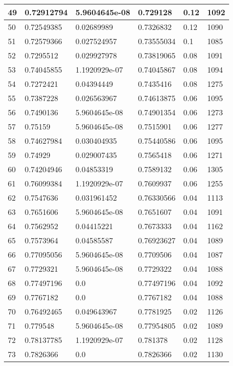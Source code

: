 \begin{longtable}{|l|l|l|l|l|l|}
49 & 0.72912794 & 5.9604645e-08 & 0.729128 & 0.12 & 1092 \\ \hline 
50 & 0.72549385 & 0.02689989 & 0.7326832 & 0.12 & 1090 \\ \hline 
51 & 0.72579366 & 0.027524957 & 0.73555034 & 0.1 & 1085 \\ \hline 
52 & 0.7295512 & 0.029927978 & 0.73819065 & 0.08 & 1091 \\ \hline 
53 & 0.74045855 & 1.1920929e-07 & 0.74045867 & 0.08 & 1094 \\ \hline 
54 & 0.7272421 & 0.04394449 & 0.7435416 & 0.08 & 1275 \\ \hline 
55 & 0.7387228 & 0.026563967 & 0.74613875 & 0.06 & 1095 \\ \hline 
56 & 0.7490136 & 5.9604645e-08 & 0.74901354 & 0.06 & 1273 \\ \hline 
57 & 0.75159 & 5.9604645e-08 & 0.7515901 & 0.06 & 1277 \\ \hline 
58 & 0.74627984 & 0.030404935 & 0.75440586 & 0.06 & 1095 \\ \hline 
59 & 0.74929 & 0.029007435 & 0.7565418 & 0.06 & 1271 \\ \hline 
60 & 0.74204946 & 0.04853319 & 0.7589132 & 0.06 & 1305 \\ \hline 
61 & 0.76099384 & 1.1920929e-07 & 0.7609937 & 0.06 & 1255 \\ \hline 
62 & 0.7547636 & 0.031961452 & 0.76330566 & 0.04 & 1113 \\ \hline 
63 & 0.7651606 & 5.9604645e-08 & 0.7651607 & 0.04 & 1091 \\ \hline 
64 & 0.7562952 & 0.04415221 & 0.7673333 & 0.04 & 1162 \\ \hline 
65 & 0.7573964 & 0.04585587 & 0.76923627 & 0.04 & 1089 \\ \hline 
66 & 0.77095056 & 5.9604645e-08 & 0.7709506 & 0.04 & 1087 \\ \hline 
67 & 0.7729321 & 5.9604645e-08 & 0.7729322 & 0.04 & 1088 \\ \hline 
68 & 0.77497196 & 0.0 & 0.77497196 & 0.04 & 1092 \\ \hline 
69 & 0.7767182 & 0.0 & 0.7767182 & 0.04 & 1088 \\ \hline 
70 & 0.76492465 & 0.049643967 & 0.7781925 & 0.02 & 1126 \\ \hline 
71 & 0.779548 & 5.9604645e-08 & 0.77954805 & 0.02 & 1089 \\ \hline 
72 & 0.78137785 & 1.1920929e-07 & 0.781378 & 0.02 & 1128 \\ \hline 
73 & 0.7826366 & 0.0 & 0.7826366 & 0.02 & 1130 \\ \hline 

\end{longtable}
